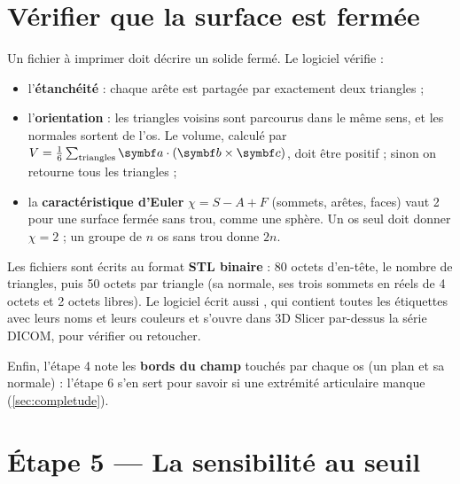 \section{Vérifier que la surface est fermée}

Un fichier à imprimer doit décrire un solide fermé. Le logiciel vérifie :
\begin{itemize}
  \item l'\textbf{étanchéité} : chaque arête est partagée par exactement deux triangles ;
  \item l'\textbf{orientation} : les triangles voisins sont parcourus dans le même sens, et les normales sortent de
  l'os. Le volume, calculé par $V = \tfrac16 \sum_{\text{triangles}} \vb{a}\cdot(\vb{b}\times\vb{c})$, doit être
  positif ; sinon on retourne tous les triangles ;
  \item la \textbf{caractéristique d'Euler} $\chi = S - A + F$ (sommets, arêtes, faces) vaut 2 pour une surface fermée
  sans trou, comme une sphère. Un os seul doit donner $\chi = 2$ ; un groupe de $n$ os sans trou donne $2n$.
\end{itemize}

Les fichiers sont écrits au format \textbf{STL binaire} : 80 octets d'en-tête, le nombre de triangles, puis
50 octets par triangle (sa normale, ses trois sommets en réels de 4 octets et 2 octets libres). Le logiciel écrit aussi
, qui contient toutes les étiquettes avec leurs noms et leurs couleurs et s'ouvre dans
3D Slicer par-dessus la série DICOM, pour vérifier ou retoucher.

Enfin, l'étape 4 note les \textbf{bords du champ} touchés par chaque os (un plan et sa normale) : l'étape 6 s'en sert
pour savoir si une extrémité articulaire manque (\cref{sec:completude}).

\section{Étape 5 — La sensibilité au seuil}
\label{sec:sensibilite}

